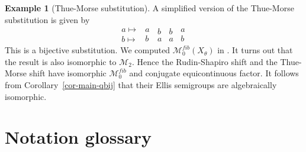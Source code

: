 \documentclass[12pt]{amsart}
\theoremstyle{definition}
\newtheorem{example}[theorem]{Example}
\numberwithin{equation}{section}
\newcommand{\M}{\mathcal M}
\newcommand{\Sfib}{\M^{fib}_0(X_\theta)}
\begin{document}
\begin{example}[Thue-Morse substitution] \label{ex:TM} A simplified version of the  Thue-Morse substitution is given by
\[
\begin{array}{c} a \mapsto\\ b\mapsto\end{array} 
\begin{array}{c} a\,\\ b \end{array}
\!\!\!\!\!\!{\begin{array}{c} b\,\\ a \end{array}}
\!\!\!\!\!\!{\begin{array}{c} b\,\\ a \end{array}}
\!\!\!\!\!\!{\begin{array}{c} a\,\\ b \end{array}}
\]
This is a bijective substitution. We computed $\Sfib$ in \cite{ESBS}. It turns out that the result is also isomorphic to $\mathcal M_2$. Hence the Rudin-Shapiro shift and the Thue-Morse shift have isomorphic $\M_0^{fib}$ and conjugate equicontinuous factor. It follows from Corollary~\ref{cor-main-qbij} that their Ellis semigroups are algebraically isomorphic. 
\end{example}
\newpage
\section{Notation glossary}\label{sec:notation glossary}
\end{document}
